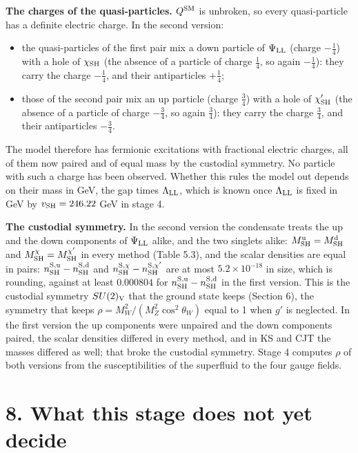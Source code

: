 \documentclass[
  10pt,
]{article}
\providecommand{\tightlist}{%
  \setlength{\itemsep}{0pt}\setlength{\parskip}{0pt}}
\begin{document}
\textbf{The charges of the quasi-particles.} \(Q^{\rm SM}\) is unbroken,
so every quasi-particle has a definite electric charge. In the second
version:

\begin{itemize}
\tightlist
\item
  the quasi-particles of the first pair mix a down particle of
  \(\Psi_{\rm LL}\) (charge \(-\tfrac14\)) with a hole of
  \(\chi_{\rm SH}\) (the absence of a particle of charge \(\tfrac14\),
  so again \(-\tfrac14\)): they carry the charge \(-\tfrac14\), and
  their antiparticles \(+\tfrac14\);
\item
  those of the second pair mix an up particle (charge \(\tfrac34\)) with
  a hole of \(\chi'_{\rm SH}\) (the absence of a particle of charge
  \(-\tfrac34\), so again \(\tfrac34\)): they carry the charge
  \(\tfrac34\), and their antiparticles \(-\tfrac34\).
\end{itemize}

The model therefore has fermionic excitations with fractional electric
charges, all of them now paired and of equal mass by the custodial
symmetry. No particle with such a charge has been observed. Whether this
rules the model out depends on their mass in GeV, the gap times
\(\Lambda_{\rm LL}\), which is known once \(\Lambda_{\rm LL}\) is fixed
in GeV by \(v_{\rm SH}=246.22\) GeV in stage 4.

\textbf{The custodial symmetry.} In the second version the condensate
treats the up and the down components of \(\Psi_{\rm LL}\) alike, and
the two singlets alike: \(M^{\rm u}_{\rm SH}=M^{\rm d}_{\rm SH}\) and
\(M^\chi_{\rm SH}=M^{\chi'}_{\rm SH}\) in every method (Table 5.3), and
the scalar densities are equal in pairs:
\(n^{\rm S,u}_{\rm SH}-n^{\rm S,d}_{\rm SH}\) and
\(n^{{\rm S},\chi}_{\rm SH}-n^{{\rm S},\chi'}_{\rm SH}\) are at most
\(5.2\times10^{-18}\) in size, which is rounding, against at least
\(0.000804\) for \(n^{\rm S,u}_{\rm SH}-n^{\rm S,d}_{\rm SH}\) in the
first version. This is the custodial symmetry \(SU(2)_{\rm V}\) that the
ground state keeps (Section 6), the symmetry that keeps
\(\rho=M_W^2/(M_Z^2\cos^2\theta_W)\) equal to 1 when \(g'\) is
neglected. In the first version the up components were unpaired and the
down components paired, the scalar densities differed in every method,
and in KS and CJT the masses differed as well; that broke the custodial
symmetry. Stage 4 computes \(\rho\) of both versions from the
susceptibilities of the superfluid to the four gauge fields.

\hypertarget{what-this-stage-does-not-yet-decide}{%
\section{8. What this stage does not yet
decide}\label{what-this-stage-does-not-yet-decide}}
\end{document}
